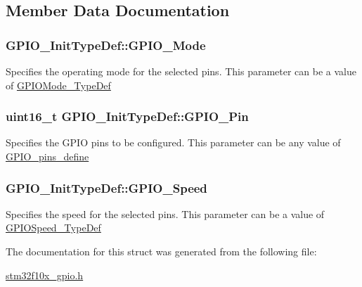 \subsection{Member Data Documentation}
\hypertarget{structGPIO__InitTypeDef_a55bd77e335c2bfeec9caa5dc922b791b}{
\subsubsection[{GPIO\_\-Mode}]{ {\bf GPIO\_\-InitTypeDef::GPIO\_\-Mode}}}
\label{structGPIO__InitTypeDef_a55bd77e335c2bfeec9caa5dc922b791b}
Specifies the operating mode for the selected pins. This parameter can be a value of \hyperlink{group__GPIO__Exported__Types_ga1347339e1c84a196fabbb31205eec5d4}{GPIOMode\_\-TypeDef} \hypertarget{structGPIO__InitTypeDef_a35fc26fc58226126c5b99478a472e5e9}{
\subsubsection[{GPIO\_\-Pin}]{\setlength{\rightskip}{0pt plus 5cm}uint16\_\-t {\bf GPIO\_\-InitTypeDef::GPIO\_\-Pin}}}
\label{structGPIO__InitTypeDef_a35fc26fc58226126c5b99478a472e5e9}
Specifies the GPIO pins to be configured. This parameter can be any value of \hyperlink{group__GPIO__pins__define}{GPIO\_\-pins\_\-define} \hypertarget{structGPIO__InitTypeDef_ac05832cacebc861a9acf5294d702c16b}{
\subsubsection[{GPIO\_\-Speed}]{ {\bf GPIO\_\-InitTypeDef::GPIO\_\-Speed}}}
\label{structGPIO__InitTypeDef_ac05832cacebc861a9acf5294d702c16b}
Specifies the speed for the selected pins. This parameter can be a value of \hyperlink{group__GPIO__Exported__Types_ga062ad92b67b4a1f301c161022cf3ba8e}{GPIOSpeed\_\-TypeDef} 

The documentation for this struct was generated from the following file:\begin{DoxyCompactItemize}
\item 
\hyperlink{stm32f10x__gpio_8h}{stm32f10x\_\-gpio.h}\end{DoxyCompactItemize}
